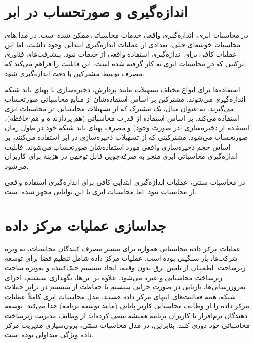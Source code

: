 \documentclass{book}
\begin{document}
        \section{اندازه‌گیری و صورتحساب در ابر}

            در محاسبات ابری، اندازه‌گیری واقعی خدمات محاسباتی ممکن شده است. در مدل‌های محاسبات خوشه‌ای قبلی، تعدادی از عملیات اندازه‌گیری ابتدایی وجود داشت، اما این عملیات کافی برای اندازه‌گیری استفاده واقعی از خدمات نبود. پیشرفت‌های فناوری ترکیبی که در محاسبات ابری به کار گرفته شده است، این قابلیت را فراهم می‌کند که مصرف توسط مشترکین با دقت اندازه‌گیری شود.

            استفاده‌ها برای انواع مختلف تسهیلات مانند پردازش، ذخیره‌سازی یا پهنای باند شبکه اندازه‌گیری می‌شوند. مشترکین بر اساس استفاده‌شان از منابع محاسباتی صورتحساب می‌گیرند. به عنوان مثال، یک مشترک که از تسهیلات محاسباتی در محاسبات ابری استفاده می‌کند، بر اساس استفاده از قدرت محاسباتی (هم پردازند  ه و هم حافظه)، استفاده از ذخیره‌سازی (در صورت وجود) و مصرف پهنای باند شبکه خود در طول زمان صورتحساب می‌شود. مشترکینی که از تسهیلات ذخیره‌سازی در ابر استفاده می‌کنند، بر اساس حجم ذخیره‌سازی واقعی مورد استفاده‌شان صورتحساب می‌شوند. قابلیت اندازه‌گیری محاسباتی ابری منجر به صرفه‌جویی قابل توجهی در هزینه برای کاربران می‌شود.

            \begin{addinfo}
                
                در محاسبات سنتی، عملیات اندازه‌گیری ابتدایی کافی برای اندازه‌گیری استفاده واقعی از محاسبات نبود. اما محاسبات ابری با این توانایی مجهز شده است.

            \end{addinfo}

        \section{جداسازی عملیات مرکز داده}

            عملیات مرکز داده محاسباتی همواره برای بیشتر مصرف کنندگان محاسبات، به ویژه شرکت‌ها، بار سنگینی بوده است. عملیات مرکز داده شامل تنظیم فضا برای توسعه زیرساخت، اطمینان از تامین برق بدون وقفه، ایجاد سیستم خنک‌کننده و به‌ویژه ساخت زیرساخت محاسباتی و غیره می‌شود. علاوه بر این‌ها، نگهداری سیستم، اجرای به‌روزرسانی‌ها، بازیابی در صورت خرابی سیستم یا حفاظت از سیستم در برابر حملات شبکه، همه فعالیت‌های انتهای مرکز داده هستند. مدل محاسبات ابری کاملاً عملیات مرکز داده را از وظایف محاسباتی کاربر پایانی (مانند توسعه برنامه) جدا می‌کند. توسعه دهندگان نرم‌افزار یا کاربران برنامه همیشه سعی کرده‌اند از وظایف مدیریت زیرساخت محاسباتی خود دوری کنند. بنابراین، در مدل محاسبات سنتی، برون‌سپاری مدیریت مرکز داده ویژگی متداولی بوده است.
\end{document}

